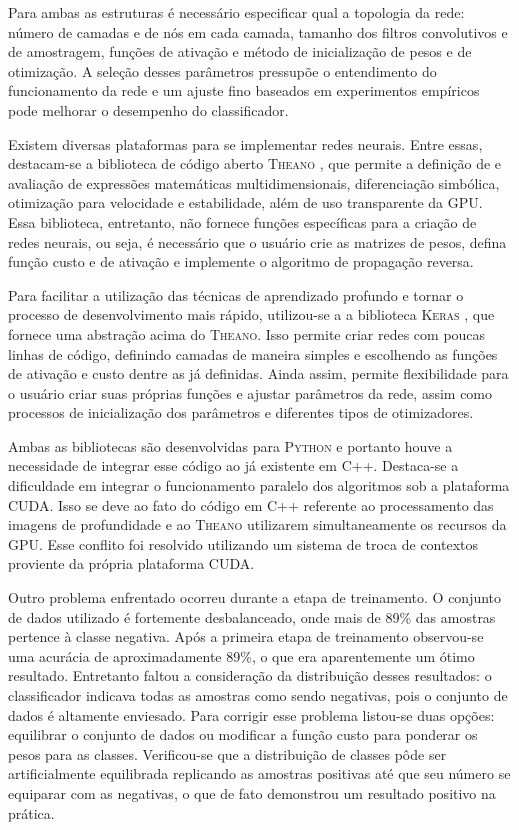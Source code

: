 Para ambas as estruturas é necessário especificar qual a topologia da rede: número de camadas e de nós em cada camada, tamanho dos filtros convolutivos e de amostragem, funções de ativação e método de inicialização de pesos e de otimização.  A seleção desses parâmetros pressupõe o entendimento do funcionamento da rede e um ajuste fino baseados em experimentos empíricos pode melhorar o desempenho do classificador.

Existem diversas plataformas para se implementar redes neurais. Entre essas, destacam-se a biblioteca de código aberto \textsc{Theano} \cite{theano}, que permite a definição de e avaliação de expressões matemáticas multidimensionais, diferenciação simbólica, otimização para velocidade e estabilidade, além de uso transparente da GPU. Essa biblioteca, entretanto, não fornece funções específicas para a criação de redes neurais, ou seja, é necessário que o usuário crie as matrizes de pesos, defina função custo e de ativação e implemente o algoritmo de propagação reversa.

Para facilitar a utilização das técnicas de aprendizado profundo e tornar o processo de desenvolvimento mais rápido, utilizou-se a a biblioteca \textsc{Keras} \cite{keras}, que fornece uma abstração acima do \textsc{Theano}. Isso permite criar redes com poucas linhas de código, definindo camadas de maneira simples e escolhendo as funções de ativação e custo dentre as já definidas. Ainda assim, permite flexibilidade para o usuário criar suas próprias funções e ajustar parâmetros da rede, assim como processos de inicialização dos parâmetros e diferentes tipos de otimizadores.

Ambas as bibliotecas são desenvolvidas para \textsc{Python} e portanto houve a necessidade de integrar esse código ao já existente em C++. Destaca-se a dificuldade em integrar o funcionamento paralelo dos algoritmos sob a plataforma CUDA. Isso se deve ao fato do código em C++ referente ao processamento das imagens de profundidade e ao \textsc{Theano} utilizarem simultaneamente os recursos da GPU. Esse conflito foi resolvido utilizando um sistema de troca de contextos proviente da própria plataforma CUDA.

Outro problema enfrentado ocorreu durante a etapa de treinamento. O conjunto de dados utilizado é fortemente desbalanceado, onde mais de 89\% das amostras pertence à classe negativa. Após a primeira etapa de treinamento observou-se uma acurácia de aproximadamente 89\%, o que era aparentemente um ótimo resultado. Entretanto faltou a consideração da distribuição desses resultados: o classificador indicava todas as amostras como sendo negativas, pois o conjunto de dados é altamente enviesado. Para corrigir esse problema listou-se duas opções: equilibrar o conjunto de dados ou modificar a função custo para ponderar os pesos para as classes. Verificou-se que a distribuição de classes pôde ser artificialmente equilibrada replicando as amostras positivas até que seu número se equiparar com as negativas, o que de fato demonstrou um resultado positivo na prática.

